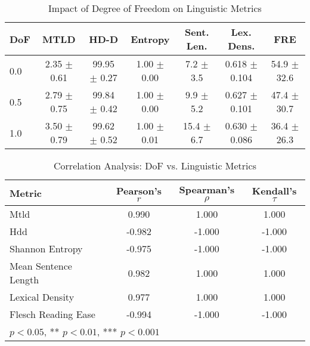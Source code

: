 \begin{table}[htbp]
\centering
\caption{Impact of Degree of Freedom on Linguistic Metrics}
\label{tab:dof_metrics}
\begin{tabular}{lcccccc}
\toprule
DoF & MTLD & HD-D & Entropy & Sent. Len. & Lex. Dens. & FRE \\
\midrule
0.0 & 2.35 $\pm$ 0.61 & 99.95 $\pm$ 0.27 & 1.00 $\pm$ 0.00 & 7.2 $\pm$ 3.5 & 0.618 $\pm$ 0.104 & 54.9 $\pm$ 32.6 \\
0.5 & 2.79 $\pm$ 0.75 & 99.84 $\pm$ 0.42 & 1.00 $\pm$ 0.00 & 9.9 $\pm$ 5.2 & 0.627 $\pm$ 0.101 & 47.4 $\pm$ 30.7 \\
1.0 & 3.50 $\pm$ 0.79 & 99.62 $\pm$ 0.52 & 1.00 $\pm$ 0.01 & 15.4 $\pm$ 6.7 & 0.630 $\pm$ 0.086 & 36.4 $\pm$ 26.3 \\
\bottomrule
\end{tabular}
\end{table}

\begin{table}[htbp]
\centering
\caption{Correlation Analysis: DoF vs. Linguistic Metrics}
\label{tab:correlations}
\begin{tabular}{lccc}
\toprule
Metric & Pearson's $r$ & Spearman's $\rho$ & Kendall's $\tau$ \\
\midrule
Mtld & 0.990 & 1.000 & 1.000 \\
Hdd & -0.982 & -1.000 & -1.000 \\
Shannon Entropy & -0.975 & -1.000 & -1.000 \\
Mean Sentence Length & 0.982 & 1.000 & 1.000 \\
Lexical Density & 0.977 & 1.000 & 1.000 \\
Flesch Reading Ease & -0.994 & -1.000 & -1.000 \\
\bottomrule
\multicolumn{4}{l}{\footnotesize * $p < 0.05$, ** $p < 0.01$, *** $p < 0.001$} \\
\end{tabular}
\end{table}